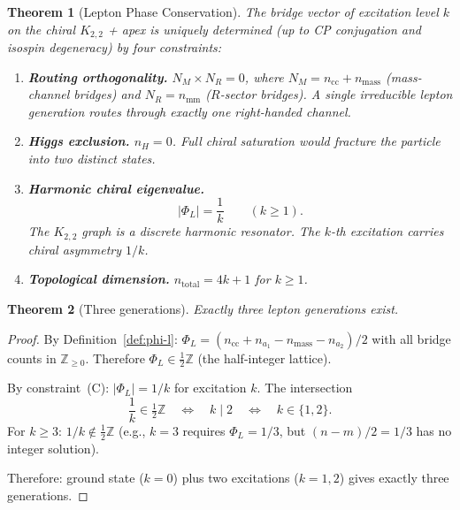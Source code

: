 \documentclass[11pt]{article}
\newtheorem{theorem}{Theorem}[section]
\begin{document}
\begin{theorem}[Lepton Phase Conservation]
\label{thm:lepton-pc}
The bridge vector of excitation level $k$ on the chiral
$K_{2,2}$ + apex is uniquely determined (up to CP
conjugation and isospin degeneracy) by four constraints:
\begin{enumerate}
\item[\textup{(A)}]
  \textbf{Routing orthogonality.}
  $N_M \times N_R = 0$, where $N_M = n_{\mathrm{cc}} +
  n_{\mathrm{mass}}$ (mass-channel bridges) and
  $N_R = n_{\mathrm{mm}}$ ($R$-sector bridges).  A single
  irreducible lepton generation routes through exactly one
  right-handed channel.

\item[\textup{(B)}]
  \textbf{Higgs exclusion.}
  $n_H = 0$.  Full chiral saturation would fracture the
  particle into two distinct states.

\item[\textup{(C)}]
  \textbf{Harmonic chiral eigenvalue.}
  \[
    |\Phi_L| = \frac{1}{k}
    \qquad (k \ge 1).
  \]
  The $K_{2,2}$ graph is a discrete harmonic resonator.
  The $k$-th excitation carries chiral asymmetry $1/k$.

\item[\textup{(D)}]
  \textbf{Topological dimension.}
  $n_{\mathrm{total}} = 4k + 1$ for $k \ge 1$.
\end{enumerate}
\end{theorem}

\begin{theorem}[Three generations]
\label{thm:three-gen}
Exactly three lepton generations exist.
\end{theorem}

\begin{proof}
By Definition~\ref{def:phi-l}:
$\Phi_L = (n_{\mathrm{cc}} + n_{a_1} -
n_{\mathrm{mass}} - n_{a_2})/2$ with all bridge counts
in $\mathbb{Z}_{\ge 0}$.  Therefore
$\Phi_L \in \tfrac{1}{2}\mathbb{Z}$
(the half-integer lattice).

By constraint~(C): $|\Phi_L| = 1/k$ for excitation $k$.
The intersection
\[
  \frac{1}{k} \in \tfrac{1}{2}\mathbb{Z}
  \quad\Longleftrightarrow\quad
  k \mid 2
  \quad\Longleftrightarrow\quad
  k \in \{1, 2\}.
\]
For $k \ge 3$: $1/k \notin \tfrac{1}{2}\mathbb{Z}$
(e.g., $k = 3$ requires $\Phi_L = 1/3$, but
$(n - m)/2 = 1/3$ has no integer solution).

Therefore: ground state ($k = 0$) plus two excitations
($k = 1, 2$) gives exactly three generations.
\end{proof}
\end{document}
